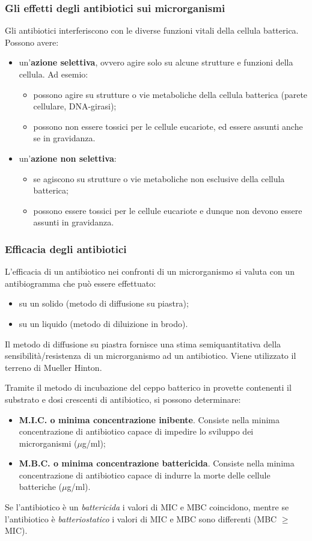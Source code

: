 \documentclass[11pt]{book}
\begin{document}
\subsubsection{Gli effetti degli antibiotici sui microrganismi}
Gli antibiotici interferiscono con le diverse funzioni vitali della cellula batterica.
Possono avere:
\begin{itemize}
\item un'\textbf{azione selettiva}, ovvero agire solo su alcune strutture e funzioni della cellula. Ad esemio:

\begin{itemize}
\item possono agire su strutture o vie metaboliche della cellula batterica (parete cellulare, DNA-girasi);
\item possono non essere tossici per le cellule eucariote, ed essere assunti  anche se in gravidanza.
\end{itemize}

\item un'\textbf{azione non selettiva}:
\begin{itemize}
\item se agiscono su strutture o vie metaboliche non esclusive della cellula batterica;
\item possono essere tossici per le cellule eucariote e dunque non devono essere assunti in gravidanza.
\end{itemize}

\end{itemize}

\subsubsection{Efficacia degli antibiotici}
L’efficacia di un antibiotico nei confronti di un microrganismo si valuta con un antibiogramma che può essere effettuato:
\begin{itemize}
\item su un solido (metodo di diffusione su piastra);
\item su un liquido (metodo di diluizione in brodo).
\end{itemize}

Il metodo di diffusione su piastra fornisce una stima semiquantitativa della sensibilità/resistenza di un microrganismo ad un antibiotico. Viene utilizzato il terreno di Mueller Hinton.

Tramite il metodo di incubazione del ceppo batterico in provette contenenti il substrato e dosi crescenti di antibiotico, si possono determinare:
\begin{itemize}
\item \textbf{M.I.C. o minima concentrazione inibente}. Consiste nella minima concentrazione di antibiotico capace di impedire lo sviluppo dei microrganismi ($\mu$g/ml);
\item \textbf{M.B.C. o minima concentrazione battericida}. Consiste nella minima concentrazione di antibiotico capace di indurre la morte delle cellule batteriche ($\mu$g/ml).
\end{itemize} 

Se l’antibiotico è un \emph{battericida} i valori di MIC e MBC coincidono, mentre se l’antibiotico è \emph{batteriostatico} i valori di MIC e MBC sono differenti (MBC $\ge$ MIC).
\end{document}
